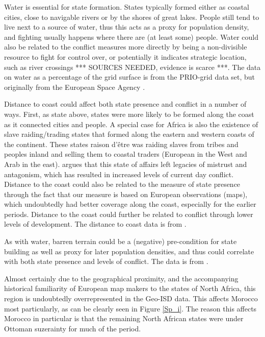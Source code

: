 \documentclass[12pt]{article}
\begin{document}
Water is essential for state formation. States typically formed either as
coastal cities, close to navigable rivers or by the shores of great lakes.
People still tend to live next to a source of water, thus this acts as a proxy
for population density, and fighting usually happens where there are (at least
some) people.  Water could also be related to the conflict measures more
directly by being a non-divisible resource to fight for control over, or
potentially it indicates strategic location, such as river crossings *** SOURCES
NEEDED, evidence is scarce ***. The data on water as a percentage of the grid
surface is from the PRIO-grid data set, but originally from the European Space
Agency \citep{Bontemps2009}.

Distance to coast could affect both state presence and conflict in a number of
ways. First, as state above, states were more likely to be formed along the
coast as it connected cities and people. A special case for Africa is also the
existence of slave raiding/trading states that formed along the eastern and
western coasts of the continent. These states raison d'être was raiding slaves
from tribes and peoples inland and selling them to coastal traders (European in
the West and Arab in the east). \citet{Nunn2008} argues that this state of
affairs left legacies of mistrust and antagonism, which has resulted in
increased levels of current day conflict. Distance to the coast could also be
related to the measure of state presence through the fact that our measure is
based on European observations (maps), which undoubtedly had better coverage
along the coast, especially for the earlier periods. Distance to the coast could
further be related to conflict through lower levels of development. The distance
to coast data is from \citet{Wessel1996}.

As with water, barren terrain could be a (negative) pre-condition for state
building as well as proxy for later population densities, and thus could
correlate with both state presence and levels of conflict. The data is from
\citet{Bontemps2009}.

Almost certainly due to the geographical proximity, and the accompanying
historical familiarity of European map makers to the states of North Africa,
this region is undoubtedly overrepresented in the Geo-ISD data. This affects
Morocco most particularly, as can be clearly seen in Figure \ref{Sp_i}. The
reason this affects Morocco in particular is that the remaining North African
states were under Ottoman suzerainty for much of the period.
\end{document}
